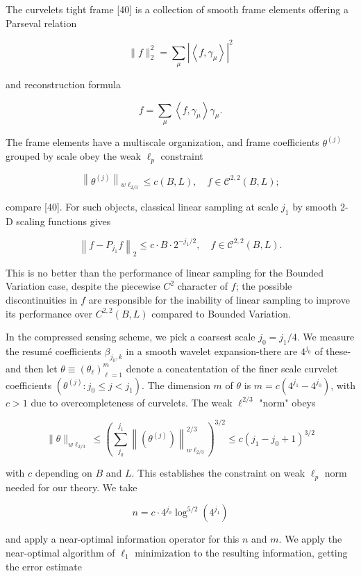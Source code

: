 \documentclass[10pt]{article}
\begin{document}
The curvelets tight frame [40] is a collection of smooth frame elements offering a Parseval relation

$$
\|f\|_{2}^{2}=\sum_{\mu}\left|\left\langle f, \gamma_{\mu}\right\rangle\right|^{2}
$$

and reconstruction formula

$$
f=\sum_{\mu}\left\langle f, \gamma_{\mu}\right\rangle \gamma_{\mu} .
$$

The frame elements have a multiscale organization, and frame coefficients $\theta^{(j)}$ grouped by scale obey the weak $\ell_{p}$ constraint

$$
\left\|\theta^{(j)}\right\|_{w \ell_{2 / 3}} \leq c(B, L), \quad f \in \mathcal{C}^{2,2}(B, L) ;
$$

compare [40]. For such objects, classical linear sampling at scale $j_{1}$ by smooth 2-D scaling functions gives

$$
\left\|f-P_{j_{1}} f\right\|_{2} \leq c \cdot B \cdot 2^{-j_{1} / 2}, \quad f \in \mathcal{C}^{2,2}(B, L) .
$$

This is no better than the performance of linear sampling for the Bounded Variation case, despite the piecewise $C^{2}$ character of $f$; the possible discontinuities in $f$ are responsible for the inability of linear sampling to improve its performance over $C^{2,2}(B, L)$ compared to Bounded Variation.

In the compressed sensing scheme, we pick a coarsest scale $j_{0}=j_{1} / 4$. We measure the resumé coefficients $\beta_{j_{0}, k}$ in a smooth wavelet expansion-there are $4^{j_{0}}$ of these-and then let $\theta \equiv\left(\theta_{\ell}\right)_{\ell=1}^{m}$ denote a concatentation of the finer scale curvelet coefficients $\left(\theta^{(j)}: j_{0} \leq j<j_{1}\right)$. The dimension $m$ of $\theta$ is $m=c\left(4^{j_{1}}-4^{j_{0}}\right)$, with $c>1$ due to overcompleteness of curvelets. The weak $\ell^{2 / 3}$ "norm" obeys

$$
\|\theta\|_{w \ell_{2 / 3}} \leq\left(\sum_{j_{0}}^{j_{1}}\left\|\left(\theta^{(j)}\right)\right\|_{w \ell_{2 / 3}}^{2 / 3}\right)^{3 / 2} \leq c\left(j_{1}-j_{0}+1\right)^{3 / 2}
$$

with $c$ depending on $B$ and $L$. This establishes the constraint on weak $\ell_{p}$ norm needed for our theory. We take

$$
n=c \cdot 4^{j_{0}} \log ^{5 / 2}\left(4^{j_{1}}\right)
$$

and apply a near-optimal information operator for this $n$ and $m$. We apply the near-optimal algorithm of $\ell_{1}$ minimization to the resulting information, getting the error estimate
\end{document}
